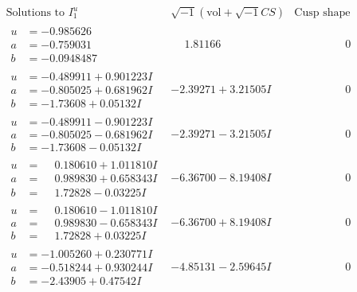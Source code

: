 \documentclass[1p]{elsarticle_modified}
\theoremstyle{definition}
\newcommand{\I}{\sqrt{-1}}
\begin{document}
$$\begin{array}{c|c|c}  
\text{Solutions to }I^u_{1}& \I (\text{vol} + \sqrt{-1}CS) & \text{Cusp shape}\\
 \hline 
\begin{aligned}
u &= -0.985626\phantom{ +0.000000I} \\
a &= -0.759031\phantom{ +0.000000I} \\
b &= -0.0948487\phantom{ +0.000000I}\end{aligned}
 & \phantom{-}1.81166\phantom{ +0.000000I} & \phantom{-0.000000 } 0 \\ \hline\begin{aligned}
u &= -0.489911 + 0.901223 I \\
a &= -0.805025 + 0.681962 I \\
b &= -1.73608 + 0.05132 I\end{aligned}
 & -2.39271 + 3.21505 I & \phantom{-0.000000 } 0 \\ \hline\begin{aligned}
u &= -0.489911 - 0.901223 I \\
a &= -0.805025 - 0.681962 I \\
b &= -1.73608 - 0.05132 I\end{aligned}
 & -2.39271 - 3.21505 I & \phantom{-0.000000 } 0 \\ \hline\begin{aligned}
u &= \phantom{-}0.180610 + 1.011810 I \\
a &= \phantom{-}0.989830 + 0.658343 I \\
b &= \phantom{-}1.72828 - 0.03225 I\end{aligned}
 & -6.36700 - 8.19408 I & \phantom{-0.000000 } 0 \\ \hline\begin{aligned}
u &= \phantom{-}0.180610 - 1.011810 I \\
a &= \phantom{-}0.989830 - 0.658343 I \\
b &= \phantom{-}1.72828 + 0.03225 I\end{aligned}
 & -6.36700 + 8.19408 I & \phantom{-0.000000 } 0 \\ \hline\begin{aligned}
u &= -1.005260 + 0.230771 I \\
a &= -0.518244 + 0.930244 I \\
b &= -2.43905 + 0.47542 I\end{aligned}
 & -4.85131 - 2.59645 I & \phantom{-0.000000 } 0 \\ \hline\begin{aligned}

\end{aligned}
\end{array}$$
\end{document}
